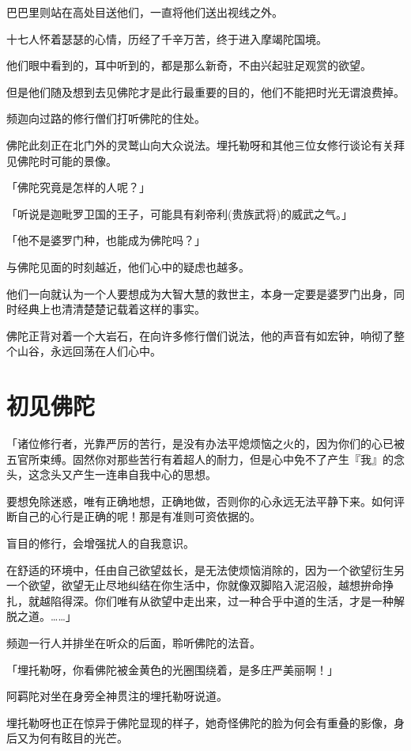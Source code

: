 \documentclass[twoside,openany]{book}
\begin{document}
巴巴里则站在高处目送他们，一直将他们送出视线之外。

十七人怀着瑟瑟的心情，历经了千辛万苦，终于进入摩竭陀国境。

他们眼中看到的，耳中听到的，都是那么新奇，不由兴起驻足观赏的欲望。

但是他们随及想到去见佛陀才是此行最重要的目的，他们不能把时光无谓浪费掉。

频迦向过路的修行僧们打听佛陀的住处。

佛陀此刻正在北门外的灵鹫山向大众说法。埋托勒呀和其他三位女修行谈论有关拜见佛陀时可能的景像。

「佛陀究竟是怎样的人呢？」

「听说是迦毗罗卫国的王子，可能具有刹帝利(贵族武将)的威武之气。」

「他不是婆罗门种，也能成为佛陀吗？」

与佛陀见面的时刻越近，他们心中的疑虑也越多。

他们一向就认为一个人要想成为大智大慧的救世主，本身一定要是婆罗门出身，同时经典上也清清楚楚记载着这样的事实。

佛陀正背对着一个大岩石，在向许多修行僧们说法，他的声音有如宏钟，响彻了整个山谷，永远回荡在人们心中。

\section{初见佛陀}\label{sec5.2}

「诸位修行者，光靠严厉的苦行，是没有办法平熄烦恼之火的，因为你们的心已被五官所束缚。固然你对那些苦行有着超人的耐力，但是心中免不了产生『我』的念头，这念头又产生一连串自我中心的思想。

要想免除迷惑，唯有正确地想，正确地做，否则你的心永远无法平静下来。如何评断自己的心行是正确的呢！那是有准则可资依据的。

盲目的修行，会增强扰人的自我意识。

在舒适的环境中，任由自己欲望兹长，是无法使烦恼消除的，因为一个欲望衍生另一个欲望，欲望无止尽地纠结在你生活中，你就像双脚陷入泥沼般，越想拚命挣扎，就越陷得深。你们唯有从欲望中走出来，过一种合乎中道的生活，才是一种解脱之道。……」

频迦一行人并排坐在听众的后面，聆听佛陀的法音。

「埋托勒呀，你看佛陀被金黄色的光圈围绕着，是多庄严美丽啊！」

阿羁陀对坐在身旁全神贯注的埋托勒呀说道。

埋托勒呀也正在惊异于佛陀显现的样子，她奇怪佛陀的脸为何会有重叠的影像，身后又为何有眩目的光芒。
\end{document}
